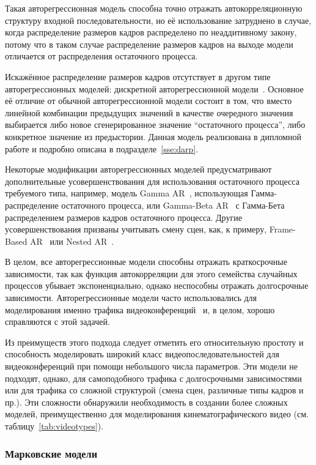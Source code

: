 Такая авторегрессионная модель способна точно отражать автокорреляционную структуру
входной последовательности, но её использование затруднено в случае, когда
распределение размеров кадров распределено по неаддитивному закону, потому что
в таком случае распределение размеров кадров на выходе модели отличается
от распределения остаточного процесса.

Искажённое распределение размеров кадров отсутствует в другом типе
авторегрессионных моделей: дискретной авторегрессионной модели~\cite{heymanATM}.
Основное её отличие от обычной авторегрессионной модели состоит
в том, что вместо линейной комбинации предыдущих значений
в качестве очередного значения выбирается либо новое сгенерированное
значение ``остаточного процесса'', либо конкретное значение из предыстории.
Данная модель реализована в дипломной работе и подробно описана в
подразделе~\ref{sse:darp}.

Некоторые модификации авторегрессионных моделей предусматривают
дополнительные усовершенствования для использования остаточного
процесса требуемого типа, например, модель Gamma AR~\cite{gar},
использующая Гамма-распределение остаточного процесса, или
Gamma-Beta AR~\cite{gbar} с Гамма-Бета распределением размеров
кадров остаточного процесса. Другие усовершенствования призваны
учитывать смену сцен, как, к примеру, Frame-Based AR~\cite{Krunz95atraffic}
или Nested AR~\cite{nestedar}.

В целом, все авторегрессионные модели способны отражать краткосрочные
зависимости, так как функция автокорреляции для этого семейства
случайных процессов убывает экспоненциально, однако неспособны
отражать долгосрочные зависимости. Авторегрессионные модели
часто использовались для моделирования именно трафика видеоконференций~\cite{ars2004}
и, в целом, хорошо справляются с этой задачей.

Из преимуществ этого подхода следует отметить его относительную простоту
и способность моделировать широкий класс видеопоследовательностей
для видеоконференций при помощи небольшого числа параметров.
Эти модели не подходят, однако, для самоподобного трафика с
долгосрочными зависимостями или для трафика со сложной структурой
(смена сцен, различные типы кадров и пр.). Эти сложности
обнаружили необходимость в создании более сложных моделей,
преимущественно для моделирования кинематографического видео
(см. таблицу~\ref{tab:videotypes}).

\subsubsection{Марковские модели}
\hspace{3pt}

